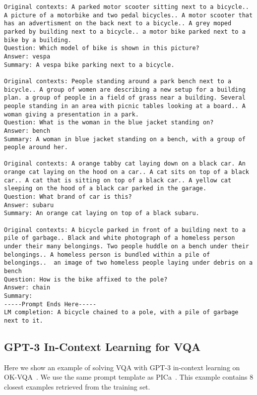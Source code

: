 \documentclass[10pt,twocolumn,letterpaper]{article}
\begin{document}
\begin{tiny}
\begin{lstlisting}[breaklines]
Original contexts: A parked motor scooter sitting next to a bicycle.. A picture of a motorbike and two pedal bicycles.. A motor scooter that has an advertisment on the back next to a bicycle.. A grey moped parked by building next to a bicycle.. a motor bike parked next to a bike by a building.
Question: Which model of bike is shown in this picture?
Answer: vespa
Summary: A vespa bike parking next to a bicycle.

Original contexts: People standing around a park bench next to a bicycle.. A group of women are describing a new setup for a building plan. a group of people in a field of grass near a building. Several people standing in an area with picnic tables looking at a board.. A woman giving a presentation in a park.
Question: What is the woman in the blue jacket standing on?
Answer: bench
Summary: A woman in blue jacket standing on a bench, with a group of people around her.

Original contexts: A orange tabby cat laying down on a black car. An orange cat laying on the hood on a car.. A cat sits on top of a black car.. A cat that is sitting on top of a black car.. A yellow cat sleeping on the hood of a black car parked in the garage.
Question: What brand of car is this?
Answer: subaru
Summary: An orange cat laying on top of a black subaru.

Original contexts: A bicycle parked in front of a building next to a pile of garbage.. Black and white photograph of a homeless person under their many belongings. Two people huddle on a bench under their belongings.. A homeless person is bundled within a pile of belongings..  an image of two homeless people laying under debris on a bench
Question: How is the bike affixed to the pole?
Answer: chain
Summary:
-----Prompt Ends Here-----
LM completion: A bicycle chained to a pole, with a pile of garbage next to it.
\end{lstlisting}
\end{tiny}


\subsection{GPT-3 In-Context Learning for VQA}

Here we show an example of solving VQA with GPT-3 in-context learning on OK-VQA~\cite{marino2019okvqa}.
We use the same prompt template as PICa~\cite{yang2022empirical}. This example contains 8 closest examples retrieved from the training set.
\end{document}
